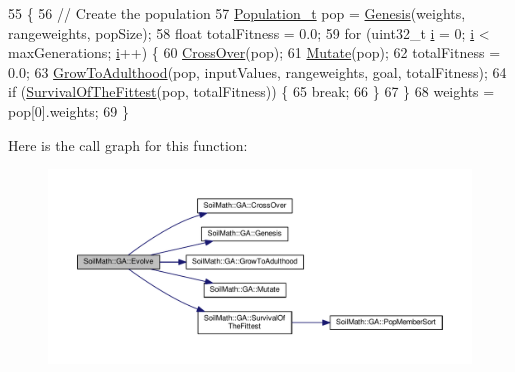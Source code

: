 \begin{DoxyCode}
55                                                            \{
56   \textcolor{comment}{// Create the population}
57   \hyperlink{_soil_math_types_8h_a8d2d4c736cf817d048a2d66dec8b12ec}{Population\_t} pop = \hyperlink{class_soil_math_1_1_g_a_a96cfe7cc5b3028a66b0136e72ea38cbc}{Genesis}(weights, rangeweights, popSize);
58   \textcolor{keywordtype}{float} totalFitness = 0.0;
59   \textcolor{keywordflow}{for} (uint32\_t \hyperlink{_comparision_pictures_2_createtest_image_8m_a6f6ccfcf58b31cb6412107d9d5281426}{i} = 0; \hyperlink{_comparision_pictures_2_createtest_image_8m_a6f6ccfcf58b31cb6412107d9d5281426}{i} < maxGenerations; \hyperlink{_comparision_pictures_2_createtest_image_8m_a6f6ccfcf58b31cb6412107d9d5281426}{i}++) \{
60     \hyperlink{class_soil_math_1_1_g_a_abf408d603b2afb188a6d265eb6309b69}{CrossOver}(pop);
61     \hyperlink{class_soil_math_1_1_g_a_a489f2afd54086c14f45b654aeec0fe3c}{Mutate}(pop);
62     totalFitness = 0.0;
63     \hyperlink{class_soil_math_1_1_g_a_aff791f50f889beb74e854942f8883b58}{GrowToAdulthood}(pop, inputValues, rangeweights, goal, totalFitness);
64     \textcolor{keywordflow}{if} (\hyperlink{class_soil_math_1_1_g_a_ac2c10631815408d044738f678c67e98b}{SurvivalOfTheFittest}(pop, totalFitness)) \{
65       \textcolor{keywordflow}{break};
66     \}
67   \}
68   weights = pop[0].weights;
69 \}
\end{DoxyCode}


Here is the call graph for this function\+:\nopagebreak
\begin{figure}[H]
\begin{center}
\leavevmode
\includegraphics[width=350pt]{class_soil_math_1_1_g_a_aca448f36c1f98b4906d0754cf354cccf_cgraph}
\end{center}
\end{figure}


\hypertarget{class_soil_math_1_1_g_a_a96cfe7cc5b3028a66b0136e72ea38cbc}{}
